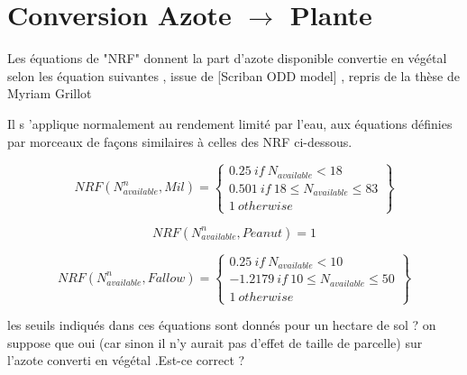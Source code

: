 \documentclass[10pt,a4paper,french]{article} %
\begin{document}
\section{Conversion Azote $\rightarrow$ Plante}



Les équations de "NRF" donnent la part d'azote disponible convertie en végétal selon les équation suivantes , issue de [Scriban ODD model]  , repris de la thèse de Myriam Grillot 


Il s 'applique normalement au rendement limité par l'eau,  aux équations définies par morceaux de façons similaires à celles des NRF  ci-dessous. 

\begin{equation}
  NRF(N_{available}^n,Mil)=\left\{
                \begin{array}{ll}
                  0.25 \ if \ N_{available} < 18\\
                0.501 \ if \ 18 \leq N_{available} \leq 83  \\
                  1 \ otherwise
                \end{array}
              \right\} 
 \end{equation} 

\begin{equation}
   NRF(N_{available}^n,Peanut)=1
  \end{equation} 
 

 \begin{equation}
   NRF(N_{available}^n,Fallow)=\left\{
                \begin{array}{ll}
                  0.25 \ if \ N_{available} < 10\\
                -1.2179 \ if \ 10 \leq N_{available} \leq 50  \\
                  1 \ otherwise
                \end{array}
              \right\}
  \end{equation} 
  
  



\begin{tcolorbox}[noparskip,
    colback=LightGreen,colframe=DarkGreen,%
    colbacklower=LimeGreen!75!LightGreen,%
    title=Question/Problème]

les seuils indiqués dans ces équations sont donnés pour un hectare de sol ? on suppose que oui (car sinon il n'y aurait pas d'effet de taille de parcelle) sur l'azote converti en végétal .Est-ce correct ? 

\end{tcolorbox}
\end{document}
